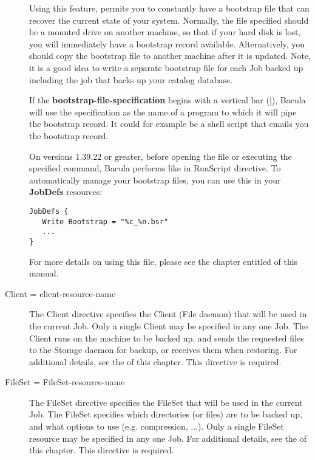 \begin{description}
   Using this feature, permits you to constantly have a bootstrap file that
   can recover the current state of your system.  Normally, the file
   specified should be a mounted drive on another machine, so that if your
   hard disk is lost, you will immediately have a bootstrap record
   available.  Alternatively, you should copy the bootstrap file to another
   machine after it is updated. Note, it is a good idea to write a separate
   bootstrap file for each Job backed up including the job that backs up
   your catalog database.

   If the {\bf bootstrap-file-specification} begins with a vertical bar
   (|), Bacula will use the specification as the name of a program to which
   it will pipe the bootstrap record.  It could for example be a shell
   script that emails you the bootstrap record.

   On versions 1.39.22 or greater, before opening the file or executing the
   specified command, Bacula performs 
    like in RunScript
   directive. To automatically manage your bootstrap files, you can use
   this in your {\bf JobDefs} resources:
\begin{verbatim}
JobDefs {
   Write Bootstrap = "%c_%n.bsr"
   ...
}
\end{verbatim}

   For more details on using this file, please see the chapter entitled
    of this manual.

\item [Client = \lt{}client-resource-name\gt{}]
   The Client directive  specifies the Client (File daemon) that will be used in
   the  current Job. Only a single Client may be specified in any one Job.  The
   Client runs on the machine to be backed up,  and sends the requested files to
   the Storage daemon for backup,  or receives them when restoring. For
   additional details, see the  
    of this chapter.
   This directive is required. 

\item [FileSet = \lt{}FileSet-resource-name\gt{}]
   The FileSet directive specifies the FileSet that will be used in the
   current Job.  The FileSet specifies which directories (or files) are to
   be backed up, and what options to use (e.g.  compression, ...).  Only a
   single FileSet resource may be specified in any one Job.  For additional
   details, see the  of
   this chapter.  This directive is required.


\end{description}

